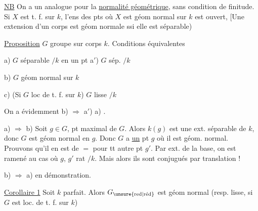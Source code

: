 \uline{NB} On a un  analogue pour la \uline{normalité géométrique}, sans condition de finitude. Si $X$ est   t. f. sur $k$, l'ens des pts où $X$ est géom normal sur $k$ est ouvert,  [Une extension d'un corps est géom normale ssi elle est séparable)


\uline{Proposition} $G$ groupe sur corps $k$. Conditions équivalentes


a) $G$  séparable $/k$ en un pt \qquad a$'$) $G$ sép. $/k$ 

b) $G$ géom normal sur $k$

c) (Si $G$ loc de t. f. sur $k$) $G$ lisse $/k$

On a évidemment  b) $\Rightarrow$ a$'$) \unsure{$\Rightarrow$|$\Longrightarrow$} a) .


a) $\Rightarrow$ b) \qquad Soit $g\in G$,  pt maximal de $G$.   Alors $k(g)$ est une ext. séparable de $k$, donc $G$ est géom normal en $g$.   Donc $G$ a \uline{un} pt $g$ où il est géom. normal. Prouvons qu'il en est de $=$ pour tt autre pt $g'$. Par ext. de la base, on est ramené au cas où $g$, $g'$ rat $/k$. Mais alors ils sont conjugués par translation !

b) $\Rightarrow$ a) \qquad {} en démonstration.

\uline{Corollaire 1} Soit $k$ parfait. Alors $G_{\text{\unsure{red|réd}}}$ est géom normal  (resp. lisse, si $G$ est loc. de t. f. sur $k$)


